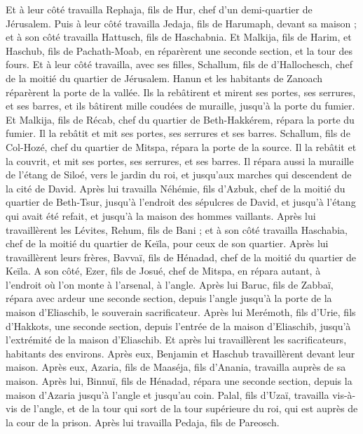 \begin{multicols}{2}
Et à leur côté travailla Rephaja, fils de Hur, chef d'un demi-quartier de Jérusalem.
Puis à leur côté travailla Jedaja, fils de Harumaph, devant sa maison ; et à son côté travailla Hattusch, fils de Haschabnia.
Et Malkija, fils de Harim, et Haschub, fils de Pachath-Moab, en réparèrent une seconde section, et la tour des fours.
Et à leur côté travailla, avec ses filles, Schallum, fils de d'Hallochesch, chef de la moitié du quartier de Jérusalem.
Hanun et les habitants de Zanoach réparèrent la porte de la vallée. Ils la rebâtirent et mirent ses portes, ses serrures, et ses barres, et ils bâtirent mille coudées de muraille, jusqu'à la porte du fumier.
Et Malkija, fils de Récab, chef du quartier de Beth-Hakkérem, répara la porte du fumier. Il la rebâtit et mit ses portes, ses serrures et ses barres.
Schallum, fils de Col-Hozé, chef du quartier de Mitspa, répara la porte de la source. Il la rebâtit et la couvrit, et mit ses portes, ses serrures, et ses barres. Il répara aussi la muraille de l'étang de Siloé, vers le jardin du roi, et jusqu'aux marches qui descendent de la cité de David.
Après lui travailla Néhémie, fils d'Azbuk, chef de la moitié du quartier de Beth-Tsur, jusqu'à l'endroit des sépulcres de David, et jusqu'à l'étang qui avait été refait, et jusqu'à la maison des hommes vaillants.
Après lui travaillèrent les Lévites, Rehum, fils de Bani ; et à son côté travailla Haschabia, chef de la moitié du quartier de Keïla, pour ceux de son quartier.
Après lui travaillèrent leurs frères, Bavvaï, fils de Hénadad, chef de la moitié du quartier de Keïla.
A son côté, Ezer, fils de Josué, chef de Mitspa, en répara autant, à l'endroit où l'on monte à l'arsenal, à l'angle.
Après lui Baruc, fils de Zabbaï, répara avec ardeur une seconde section, depuis l'angle jusqu'à la porte de la maison d'Eliaschib, le souverain sacrificateur.
Après lui Merémoth, fils d'Urie, fils d'Hakkots, une seconde section, depuis l'entrée de la maison d'Eliaschib, jusqu'à l'extrémité de la maison d'Eliaschib.
Et après lui travaillèrent les sacrificateurs, habitants des environs.
Après eux, Benjamin et Haschub travaillèrent devant leur maison. Après eux, Azaria, fils de Maaséja, fils d'Anania, travailla auprès de sa maison.
Après lui, Binnuï, fils de Hénadad, répara une seconde section, depuis la maison d'Azaria jusqu'à l'angle et jusqu'au coin.
Palal, fils d'Uzaï, travailla vis-à-vis de l'angle, et de la tour qui sort de la tour supérieure du roi, qui est auprès de la cour de la prison. Après lui travailla Pedaja, fils de Pareosch.

\end{multicols}
